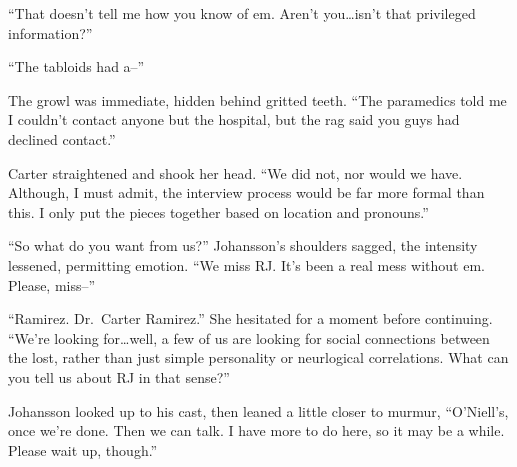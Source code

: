 ``That doesn't tell me how you know of em. Aren't you\ldots{}isn't that privileged information?''

``The tabloids had a--''

The growl was immediate, hidden behind gritted teeth. ``The paramedics told me I couldn't contact anyone but the hospital, but the rag said you guys had declined contact.''

Carter straightened and shook her head. ``We did not, nor would we have. Although, I must admit, the interview process would be far more formal than this. I only put the pieces together based on location and pronouns.''

``So what do you want from us?'' Johansson's shoulders sagged, the intensity lessened, permitting emotion. ``We miss RJ. It's been a real mess without em. Please, miss--''

``Ramirez. Dr.~Carter Ramirez.'' She hesitated for a moment before continuing. ``We're looking for\ldots{}well, a few of us are looking for social connections between the lost, rather than just simple personality or neurlogical correlations. What can you tell us about RJ in that sense?''

Johansson looked up to his cast, then leaned a little closer to murmur, ``O'Niell's, once we're done. Then we can talk. I have more to do here, so it may be a while. Please wait up, though.''
